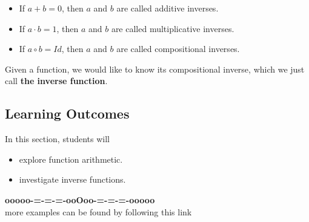 \documentclass{ximera}
\begin{document}
\begin{itemize}
\item If $a + b = 0$, then $a$ and $b$ are called additive inverses.
\item If $a \cdot b = 1$, then $a$ and $b$ are called multiplicative inverses.
\item If $a \circ b = Id$, then $a$ and $b$ are called compositional inverses.
\end{itemize}


Given a function, we would like to know its compositional inverse, which we just call \textbf{\textcolor{purple!85!blue}{the inverse function}}.







\subsection*{Learning Outcomes}


\begin{sectionOutcomes}
In this section, students will 

\begin{itemize}
\item explore function arithmetic.
\item investigate inverse functions.
\end{itemize}
\end{sectionOutcomes}













\begin{center}
\textbf{\textcolor{green!50!black}{ooooo-=-=-=-ooOoo-=-=-=-ooooo}} \\

more examples can be found by following this link\\ 

\end{center}
\end{document}
